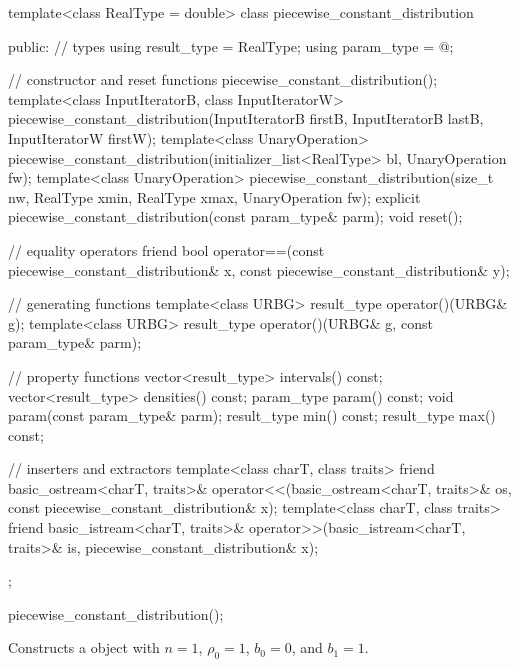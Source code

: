 %
%
\begin{codeblock}
template<class RealType = double>
  class piecewise_constant_distribution {
  public:
    // types
    using result_type = RealType;
    using param_type  = @\unspec@;

    // constructor and reset functions
    piecewise_constant_distribution();
    template<class InputIteratorB, class InputIteratorW>
      piecewise_constant_distribution(InputIteratorB firstB, InputIteratorB lastB,
                                      InputIteratorW firstW);
    template<class UnaryOperation>
      piecewise_constant_distribution(initializer_list<RealType> bl, UnaryOperation fw);
    template<class UnaryOperation>
      piecewise_constant_distribution(size_t nw, RealType xmin, RealType xmax,
                                      UnaryOperation fw);
    explicit piecewise_constant_distribution(const param_type& parm);
    void reset();

    // equality operators
    friend bool operator==(const piecewise_constant_distribution& x,
                           const piecewise_constant_distribution& y);

    // generating functions
    template<class URBG>
      result_type operator()(URBG& g);
    template<class URBG>
      result_type operator()(URBG& g, const param_type& parm);

    // property functions
    vector<result_type> intervals() const;
    vector<result_type> densities() const;
    param_type param() const;
    void param(const param_type& parm);
    result_type min() const;
    result_type max() const;

    // inserters and extractors
    template<class charT, class traits>
      friend basic_ostream<charT, traits>&
        operator<<(basic_ostream<charT, traits>& os, const piecewise_constant_distribution& x);
    template<class charT, class traits>
      friend basic_istream<charT, traits>&
        operator>>(basic_istream<charT, traits>& is, piecewise_constant_distribution& x);
  };
\end{codeblock}


%
\begin{itemdecl}
piecewise_constant_distribution();
\end{itemdecl}

\begin{itemdescr}
\pnum
\effects
Constructs a  object
 with $n = 1$,
 $\rho_0 = 1$,
 $b_0 = 0$,
 and $b_1 = 1$.
\end{itemdescr}


